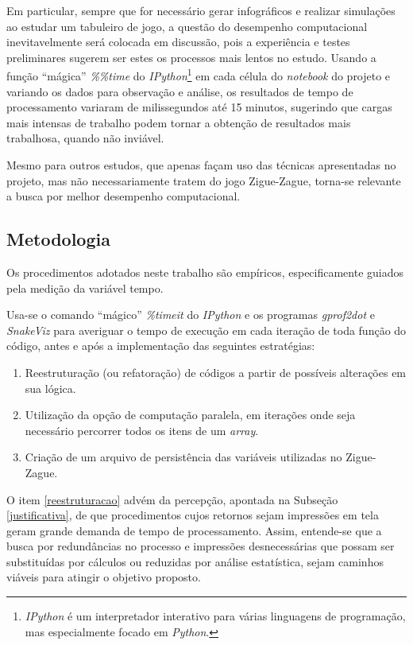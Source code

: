 \documentclass[12pt]{article}
\newcommand{\aspas}[1]{``#1''} %
\begin{document}
Em particular, sempre que for necessário gerar infográficos e realizar simulações ao estudar um tabuleiro de jogo, a questão do desempenho computacional inevitavelmente será colocada em discussão, pois a experiência e testes preliminares sugerem ser estes os processos mais lentos no estudo. Usando a função \aspas{mágica} \textit{\%\%time} do \textit{IPython}\footnote{\textit{IPython} é um interpretador interativo para várias linguagens de programação, mas especialmente focado em \textit{Python}.} em cada célula do \textit{notebook} do projeto e variando os dados para observação e análise, os resultados de tempo de processamento variaram de milissegundos até 15 minutos, sugerindo que cargas mais intensas de trabalho podem tornar a obtenção de resultados mais trabalhosa, quando não inviável. 

Mesmo para outros estudos, que apenas façam uso das técnicas apresentadas no projeto, mas não necessariamente tratem do jogo Zigue-Zague, torna-se relevante a busca por melhor desempenho computacional.

\subsection{Metodologia}
\label{metodologia}

Os procedimentos adotados neste trabalho são empíricos, especificamente guiados pela medição da variável tempo.

Usa-se o comando \aspas{mágico} \textit{\%timeit} do \textit{IPython} e os programas \textit{gprof2dot} e \textit{SnakeViz} para averiguar o tempo de execução em cada iteração de toda função do código, antes e após a implementação das seguintes estratégias:

\begin{enumerate}
	\item \label{reestruturacao} Reestruturação (ou refatoração) de códigos a partir de possíveis alterações em sua lógica.
	
	\item \label{paralela} Utilização da opção de computação paralela, em iterações onde seja necessário percorrer todos os itens de um \textit{array}.
	
	\item \label{persistencia} Criação de um arquivo de persistência das variáveis utilizadas no Zigue-Zague.
\end{enumerate}

O item \ref{reestruturacao} advém da percepção, apontada na Subseção \ref{justificativa}, de que procedimentos cujos retornos sejam impressões em tela geram grande demanda de tempo de processamento. Assim, entende-se que a busca por redundâncias no processo e impressões desnecessárias que possam ser substituídas por cálculos ou reduzidas por análise estatística, sejam caminhos viáveis para atingir o objetivo proposto.
\end{document}
